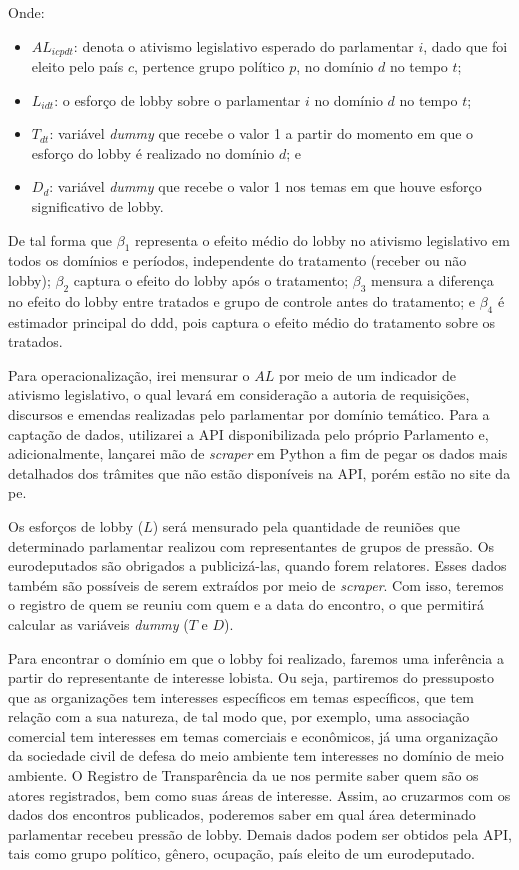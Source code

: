 Onde:
\begin{itemize}
    \item $AL_{icpdt}$: denota o ativismo legislativo esperado do parlamentar $i$, dado que foi eleito pelo país $c$, pertence grupo político $p$, no domínio $d$ no tempo $t$;
    \item $L_{idt}$: o esforço de lobby sobre o parlamentar $i$ no domínio $d$ no tempo $t$;
    \item $T_{dt}$: variável \textit{dummy} que recebe o valor 1 a partir do momento em que o esforço do lobby é realizado no domínio $d$; e
    \item $D_d$: variável \textit{dummy} que recebe o valor 1 nos temas em que houve esforço significativo de lobby.
\end{itemize}

De tal forma que $\beta_1$ representa o efeito médio do lobby no ativismo legislativo em todos os domínios e períodos, independente do tratamento (receber ou não lobby); $\beta_2$ captura o efeito do lobby após o tratamento; $\beta_3$ mensura a diferença no efeito do lobby entre tratados e grupo de controle antes do tratamento; e $\beta_4$ é estimador principal do \acrshort{ddd}, pois captura o efeito médio do tratamento sobre os tratados.

Para operacionalização, irei mensurar o $AL$ por meio de um indicador de ativismo legislativo, o qual levará em consideração a autoria de requisições, discursos e emendas realizadas pelo parlamentar por domínio temático. Para a captação de dados, utilizarei a API disponibilizada pelo próprio Parlamento e, adicionalmente, lançarei mão de \textit{scraper} em Python a fim de pegar os dados mais detalhados dos trâmites que não estão disponíveis na API, porém estão no site da \acrshort{pe}.

Os esforços de lobby ($L$) será mensurado pela quantidade de reuniões que determinado parlamentar realizou com representantes de grupos de pressão. Os eurodeputados são obrigados a publicizá-las, quando forem relatores. Esses dados também são possíveis de serem extraídos por meio de \textit{scraper}. Com isso, teremos o registro de quem se reuniu com quem e a data do encontro, o que permitirá calcular as variáveis \textit{dummy} ($T$ e $D$).

Para encontrar o domínio em que o lobby foi realizado, faremos uma inferência a partir do representante de interesse lobista. Ou seja, partiremos do pressuposto que as organizações tem interesses específicos em temas específicos, que tem relação com a sua natureza, de tal modo que, por exemplo, uma associação comercial tem interesses em temas comerciais e econômicos, já uma organização da sociedade civil de defesa do meio ambiente tem interesses no domínio de meio ambiente. O Registro de Transparência da \acrshort{ue} nos permite saber quem são os atores registrados, bem como suas áreas de interesse. Assim, ao cruzarmos com os dados dos encontros publicados, poderemos saber em qual área determinado parlamentar recebeu pressão de lobby. Demais dados podem ser obtidos pela API, tais como grupo político, gênero, ocupação, país eleito de um eurodeputado. 




